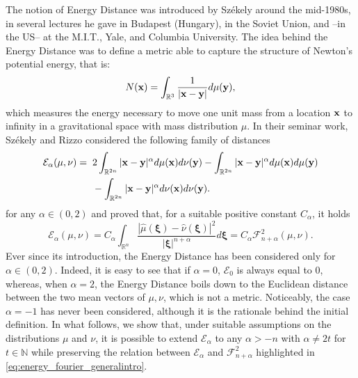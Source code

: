 \documentclass{article}
\newcommand{\bv}{\mathrm{BV}}
\renewcommand{\le}{\leqslant}
\newcommand{\R}{\mathbb R}
\def\R{\mathbb{R}}
\def\bx{{\bf x}}
\def\by{{\bf y}}
\def\bv{{\bf v}}
\def\bw{{\bf w}}
\def\bxi{{\pmb\xi}}
\def \erre{\mathbb{R}}
\def \enne{\mathbb{N}}
\newtheorem{remark}{Remark}
\begin{document}
% 
The notion of Energy Distance was introduced by Sz\'ekely around the mid-1980s, in several lectures he gave in Budapest (Hungary), in the Soviet Union, and --in  the US-- at the M.I.T., Yale, and Columbia University.\cite{Sze89,Sze03}
% 
The idea behind the Energy Distance was to define a metric able to capture the structure of Newton's potential energy, that is:
%  
\begin{equation}
    \label{eq:newtonspotential}
    N(\bx) = \int_{\R^3} \frac {1}{|\bx-\by|}d\mu(\by),
\end{equation}
% 
which measures the energy necessary to move one unit mass from a location $\bx$ to infinity in a gravitational space with mass distribution $\mu$.
% 
% 
% 
In their seminar work, Sz\'ekely and Rizzo considered the following family of distances
% 
\begin{align}
    \label{eq:orig_endist}
    \mathcal{E}_\alpha(\mu,\nu) = &\;\;2\int_{\R^{2n}}|\bx-\by|^{\alpha} d\mu(\bx) d\nu(\by) - \int_{\R^{2n}}|\bx-\by|^{\alpha} d\mu(\bx) d\mu(\by)\\
        \nonumber&\;\; - \int_{\R^{2n}}|\bx-\by|^{\alpha} d\nu(\bx) d\nu(\by).
\end{align}
for any $\alpha\in(0,2)$ and proved that, for a suitable positive constant $C_\alpha$, it holds
\begin{equation}
    \label{eq:energy_fourier_generalintro}
    \mathcal{E}_\alpha(\mu,\nu) = C_\alpha \int_{\erre^n}\frac{|\hat\mu(\bxi)-\hat\nu(\bxi)|^2}{|\bxi|^{n+\alpha}}d\bxi = C_\alpha\mathcal{F}_{n+\alpha}^2(\mu,\nu).
\end{equation}
% 
Ever since its introduction, the Energy Distance has been considered only for $\alpha\in(0,2)$.
% 
Indeed, it is easy to see that if $\alpha=0$, $\mathcal{E}_0$ is always equal to $0$, whereas, when $\alpha=2$, the Energy Distance boils down to the Euclidean distance between the two mean vectors of $\mu,\nu$, which is not a metric.
% 
Noticeably, the case $\alpha=-1$ has never been considered, although it is the rationale behind the initial definition.
% 
In what follows, we show that, under suitable assumptions on the distributions $\mu$ and $\nu$, it is possible to extend $\mathcal{E}_\alpha$ to any $\alpha > -n$ with $\alpha\neq 2t$ for $t\in\enne$ while preserving the relation between $\mathcal{E}_\alpha$ and $\mathcal{F}_{n+\alpha}^2$ highlighted in \ref{eq:energy_fourier_generalintro}.
% 
\end{document}
